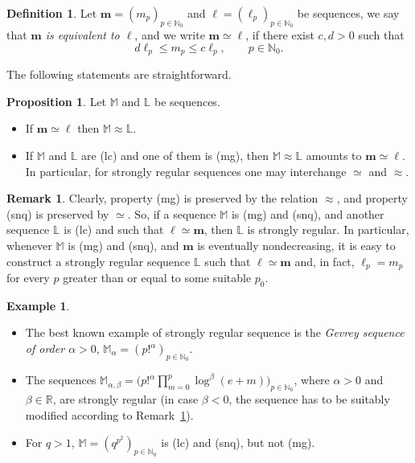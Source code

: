\documentclass[11pt,a4paper]{article}
\theoremstyle{definition}
\newtheorem{pro}[theo]{Proposition}
\newtheorem{defi}[theo]{Definition}
\newtheorem{rema}[theo]{Remark}
\newtheorem{exam}[theo]{Example}
\newenvironment{prop}{\smallskip\begin{pro}}{\end{pro}\smallskip}
\def\a{\alpha}
\def\b{\beta}
\def\bl{\boldsymbol{\ell}}
\def\N{\mathbb{N}}
\def\R{\mathbb{R}}
\def\M{\mathbb{M}}
\def\L{\mathbb{L}} %
\def\bm{\boldsymbol{m}}
\begin{document}
\begin{defi} Let $\bm=(m_p)_{p\in\N_0}$ and $\bl=(\ell_p)_{p\in\N_0}$ be sequences,
we say that {\it $\bm$ is equivalent to $\bl$}, and we write $\bm\simeq\bl$, if there exist $c,d>0$ such that
 $$d  \ell_p \leq m_p \leq c \ell_p, \qquad p \in \N_0.$$
\end{defi}

The following statements are straightforward.

\begin{prop}\label{propRelacionOrdenes}
Let $\M$ and $\L$ be sequences.
\begin{itemize}
\item[(i)] If  $\bm\simeq\bl$ then  $\M\approx\L$.
\item[(ii)] If $\M$ and $\L$ are (lc) and one of them is (mg), then $\M\approx\L$ amounts to $\bm\simeq\bl$.
In particular, for strongly regular sequences one may interchange $\simeq$ and $\approx$.
\end{itemize}
\end{prop}




\begin{rema}\label{remaCambioSucesNoLogarConvex}
Clearly, property (mg) is preserved by the relation $\approx$, and property (snq) is preserved by $\simeq$. So, if a sequence $\M$ is (mg) and (snq), and another sequence $\L$ is (lc) and such that $\bl\simeq\bm$, then $\L$ is strongly regular. In particular, whenever $\M$ is (mg) and (snq), and $\bm$ is eventually nondecreasing, it is easy to construct a strongly regular sequence $\L$ such that $\bl\simeq\bm$ and, in fact,
$\ell_p=m_p$ for every $p$ greater than or equal to some suitable $p_0$.
\end{rema}

\begin{exam}\label{examstroregusequ}
\begin{itemize}
\item[(i)] The best known example of strongly regular sequence is the \textit{Gevrey sequence of order $\a>0$}, $\M_{\a}=(p!^{\a})_{p\in\N_{0}}$.
\item[(ii)] The sequences $\M_{\a,\b}=\big(p!^{\a}\prod_{m=0}^p\log^{\b}(e+m)\big)_{p\in\N_0}$, where $\a>0$ and $\b\in\R$, are strongly regular (in case $\b<0$, the sequence has to be suitably modified according to Remark~\ref{remaCambioSucesNoLogarConvex}).
\item[(iii)] For $q>1$, $\M=(q^{p^2})_{p\in\N_0}$ is (lc) and (snq), but not (mg).
\end{itemize}
\end{exam}
\end{document}
